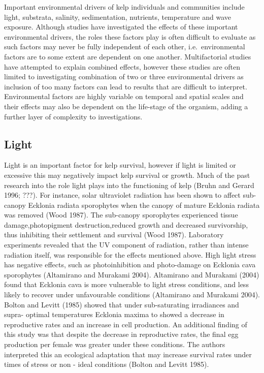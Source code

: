 \documentclass[]{article}
\begin{document}
Important environmental drivers of kelp individuals and communities
include light, substrata, salinity, sedimentation, nutrients,
temperature and wave exposure. Although studies have investigated the
effects of these important environmental drivers, the roles these
factors play is often difficult to evaluate as such factors may never be
fully independent of each other, i.e.~environmental factors are to some
extent are dependent on one another. Multifactorial studies have
attempted to explain combined effects, however these studies are often
limited to investigating combination of two or three environmental
drivers as inclusion of too many factors can lead to results that are
difficult to interpret. Environmental factors are highly variable on
temporal and spatial scales and their effects may also be dependent on
the life-stage of the organism, adding a further layer of complexity to
investigations.

\hypertarget{light}{%
\subsection{Light}\label{light}}

Light is an important factor for kelp survival, however if light is
limited or excessive this may negatively impact kelp survival or growth.
Much of the past research into the role light plays into the functioning
of kelp (Bruhn and Gerard 1996; ???). For instance, solar ultraviolet
radiation has been shown to affect sub-canopy Ecklonia radiata
sporophytes when the canopy of mature Ecklonia radiata was removed (Wood
1987). The sub-canopy sporophytes experienced tissue damage,photopigment
destruction,reduced growth and decreased survivorship, thus inhibiting
their settlement and survival (Wood 1987). Laboratory experiments
revealed that the UV component of radiation, rather than intense
radiation itself, was responsible for the effects mentioned above. High
light stress has negative effects, such as photoinhibition and
photo-damage on Ecklonia cava sporophytes (Altamirano and Murakami
2004). Altamirano and Murakami (2004) found that Ecklonia cava is more
vulnerable to light stress conditions, and less likely to recover under
unfavourable conditions (Altamirano and Murakami 2004). Bolton and
Levitt (1985) showed that under sub-saturating irradiances and supra-
optimal temperatures Ecklonia maxima to showed a decrease in
reproductive rates and an increase in cell production. An additional
finding of this study was that despite the decrease in reproductive
rates, the final egg production per female was greater under these
conditions. The authors interpreted this an ecological adaptation that
may increase survival rates under times of stress or non - ideal
conditions (Bolton and Levitt 1985).
\end{document}
